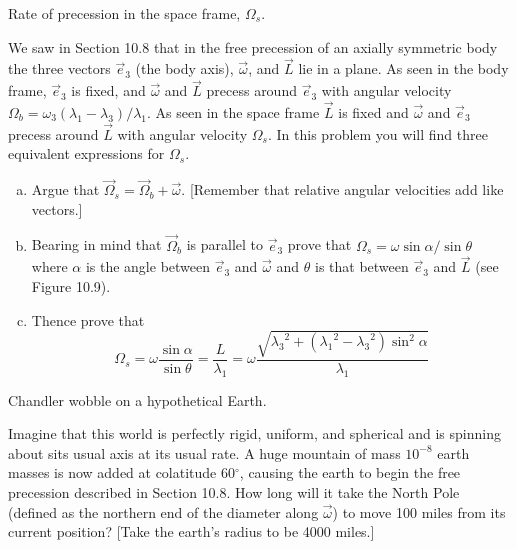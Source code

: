 \documentclass[11pt,letterpaper,boxed]{../hmcpsetrhino}
\begin{document}
\begin{problem}[iii]
Rate of precession in the space frame, $\Omega_s$.

\begin{problem}[10.46]
 We saw in Section 10.8 that in the free precession of an axially symmetric body the three vectors $\vec e_3$ (the body axis), $\vec \omega$, and $\vec L$ lie in a plane. As seen in the body frame, $\vec e_3$ is fixed, and $\vec \omega$ and $\vec L$ precess around $\vec e_3$ with angular velocity $\Omega_b = \omega_3 (\lambda_1 - \lambda_3)/\lambda_1$. As seen in the space frame $\vec L$ is fixed and $\vec \omega$ and $\vec e_3$ precess around $\vec L$ with angular velocity $\Omega_s$. In this problem you will find three equivalent expressions for $\Omega_s$. 
 \begin{enumerate}[(a)]
 \item Argue that $\vec \Omega_s = \vec \Omega_b + \vec \omega$. [Remember that relative angular velocities add like vectors.]
 
 \item Bearing in mind that $\vec \Omega_b$ is parallel to $\vec e_3$ prove that $\Omega_s = \omega \sin \alpha / \sin \theta$ where $\alpha$ is the angle between $\vec e_3$ and $\vec \omega$ and $\theta$ is that between $\vec e_3$ and $\vec L$ (see Figure 10.9). 
 
 \item Thence prove that
 \[	\Omega_s = \omega \frac{\sin \alpha}{\sin \theta} = \frac{L}{\lambda_1} = \omega \frac{\sqrt{{\lambda_3}^2 + ({\lambda_1}^2 - {\lambda_3}^2) \sin^2 \alpha}}{\lambda_1}\]
 
 \end{enumerate}

\end{problem}
\end{problem}
\begin{solution}


\vfill
\end{solution}

\newpage 

\begin{problem}[iv]
Chandler wobble on a hypothetical Earth.

\begin{problem}[10.47]
Imagine that this world is perfectly rigid, uniform, and spherical and is spinning about sits usual axis at its usual rate. A huge mountain of mass $10^{-8}$ earth masses is now added at colatitude 60$^\circ$, causing the earth to begin the free precession described in Section 10.8. How long will it take the North Pole (defined as the northern end of the diameter along $\vec \omega$) to move 100 miles from its current position? [Take the earth's radius to be 4000 miles.]

\end{problem}
\end{problem}
\begin{solution}


\vfill
\end{solution}
\end{document}
